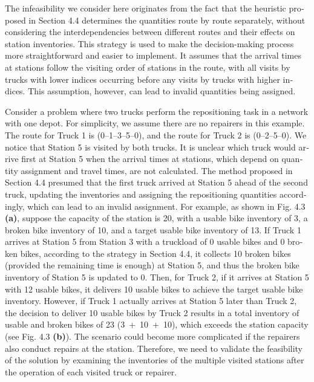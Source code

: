 \documentclass[
  english,
]{article}
\begin{document}
\begin{otherlanguage}{english}
\protect{}\label{p0540}
The infeasibility we consider here originates from the fact that the heuristic proposed in Section
4.4 determines the quantities route by route separately, without considering the interdependencies
between different routes and their effects on station inventories. This strategy is used to make the
decision-making process more straightforward and easier to implement. It assumes that the arrival
times at stations follow the visiting order of stations in the route, with all visits by trucks with
lower indices occurring before any visits by trucks with higher indices. This assumption, however,
can lead to invalid quantities being assigned.

\protect{}\label{p0545}
Consider a problem where two trucks perform the repositioning task in a network with one depot. For
simplicity, we assume there are no repairers in this example. The route for Truck 1 is
(0--1--3--5--0), and the route for Truck 2 is (0--2--5--0). We notice that Station 5 is visited by
both trucks. It is unclear which truck would arrive first at Station 5 when the arrival times at
stations, which depend on quantity assignment and travel times, are not calculated. The method
proposed in Section 4.4 presumed that the first truck arrived at Station 5 ahead of the second
truck, updating the inventories and assigning the repositioning quantities accordingly, which can
lead to an invalid assignment. For example, as shown in Fig. 4.3 \textbf{(a)}, suppose the capacity
of the station is 20, with a usable bike inventory of 3, a broken bike inventory of 10, and a target
usable bike inventory of 13. If Truck 1 arrives at Station 5 from Station 3 with a truckload of 0
usable bikes and 0 broken bikes, according to the strategy in Section 4.4, it collects 10 broken
bikes (provided the remaining time is enough) at Station 5, and thus the broken bike inventory of
Station 5 is updated to 0. Then, for Truck 2, if it arrives at Station 5 with 12 usable bikes, it
delivers 10 usable bikes to achieve the target usable bike inventory. However, if Truck 1 actually
arrives at Station 5 later than Truck 2, the decision to deliver 10 usable bikes by Truck 2 results
in a total inventory of usable and broken bikes of 23 (3~+~10~+~10), which exceeds the station
capacity (see Fig. 4.3 \textbf{(b)}). The scenario could become more complicated if the repairers
also conduct repairs at the station. Therefore, we need to validate the feasibility of the solution
by examining the inventories of the multiple visited stations after the operation of each visited
truck or repairer.


\end{otherlanguage}
\end{document}
